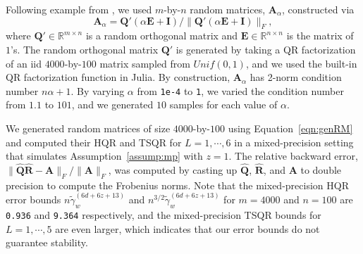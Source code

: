 \documentclass[review,onefignum,onetabnum]{siamart190516}
\newcommand{\R}{\mathbb{R}}
\newcommand{\bb}[1]{\mathbf{#1}}
\begin{document}
%

Following example from \cite{Mori2012}, we used $m$-by-$n$ random matrices, $\bb{A}_{\alpha}$, constructed via
\begin{equation}
\bb{A}_{\alpha} = \bb{Q'}(\alpha \bb{E} + \bb{I})/\|\bb{Q'}(\alpha \bb{E} + \bb{I})\|_F,
\label{eqn:genRM}
\end{equation}
where $\bb{Q'}\in\mathbb{R}^{m\times n}$ is a random orthogonal matrix and $\bb{E}\in\R^{n\times n}$ is the matrix of $1$'s. 
The random orthogonal matrix $\bb{Q'}$ is generated by taking a QR factorization of an iid $4000$-by-$100$ matrix sampled from $Unif(0,1)$, and we used the built-in QR factorization function in Julia.
By construction, $\bb{A}_{\alpha}$ has 2-norm condition number $n\alpha+1$. 
By varying $\alpha$ from {\tt 1e-4} to {\tt 1}, we varied the condition number from $1.1$ to $101$, and we generated $10$ samples for each value of $\alpha$.



We generated random matrices of size $4000$-by-$100$ using Equation~\ref{eqn:genRM} and computed their HQR and TSQR for $L=1, \cdots, 6$ in a mixed-precision setting that simulates Assumption~\ref{assump:mp} with $z=1$.
The relative backward error, $\|\hat{\bb{Q}}\hat{\bb{R}}-\bb{A}\|_F/\|\bb{A}\|_F$, was computed by casting up $\hat{\bb{Q}}$, $\hat{\bb{R}}$, and $\bb{A}$ to double precision to compute the Frobenius norms.
Note that the mixed-precision HQR error bounds $n\tilde{\gamma}_{w}^{(6d+6z+13)}$ and $n^{3/2}\tilde{\gamma}_{w}^{(6d+6z+13)}$ for $m=4000$ and $n=100$ are {\tt 0.936} and {\tt 9.364} respectively, and the mixed-precision TSQR bounds for $L=1,\cdots, 5$  are even larger, which indicates that our error bounds do not guarantee stability.\par
\end{document}
